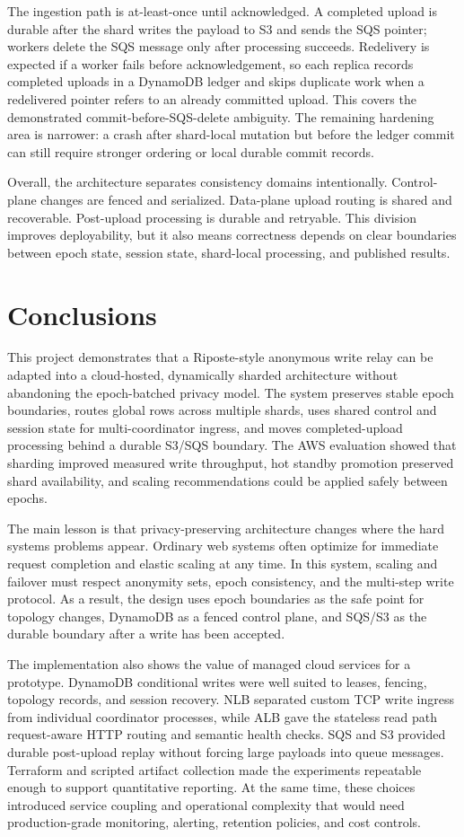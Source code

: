 \documentclass[conference]{IEEEtran}
\begin{document}
The ingestion path is at-least-once until acknowledged. A completed upload is durable after the shard writes the payload to S3 and sends the SQS pointer; workers delete the SQS message only after processing succeeds. Redelivery is expected if a worker fails before acknowledgement, so each replica records completed uploads in a DynamoDB ledger and skips duplicate work when a redelivered pointer refers to an already committed upload. This covers the demonstrated commit-before-SQS-delete ambiguity. The remaining hardening area is narrower: a crash after shard-local mutation but before the ledger commit can still require stronger ordering or local durable commit records.

Overall, the architecture separates consistency domains intentionally. Control-plane changes are fenced and serialized. Data-plane upload routing is shared and recoverable. Post-upload processing is durable and retryable. This division improves deployability, but it also means correctness depends on clear boundaries between epoch state, session state, shard-local processing, and published results.

\section{Conclusions}

This project demonstrates that a Riposte-style anonymous write relay can be adapted into a cloud-hosted, dynamically sharded architecture without abandoning the epoch-batched privacy model. The system preserves stable epoch boundaries, routes global rows across multiple shards, uses shared control and session state for multi-coordinator ingress, and moves completed-upload processing behind a durable S3/SQS boundary. The AWS evaluation showed that sharding improved measured write throughput, hot standby promotion preserved shard availability, and scaling recommendations could be applied safely between epochs.

The main lesson is that privacy-preserving architecture changes where the hard systems problems appear. Ordinary web systems often optimize for immediate request completion and elastic scaling at any time. In this system, scaling and failover must respect anonymity sets, epoch consistency, and the multi-step write protocol. As a result, the design uses epoch boundaries as the safe point for topology changes, DynamoDB as a fenced control plane, and SQS/S3 as the durable boundary after a write has been accepted.

The implementation also shows the value of managed cloud services for a prototype. DynamoDB conditional writes were well suited to leases, fencing, topology records, and session recovery. NLB separated custom TCP write ingress from individual coordinator processes, while ALB gave the stateless read path request-aware HTTP routing and semantic health checks. SQS and S3 provided durable post-upload replay without forcing large payloads into queue messages. Terraform and scripted artifact collection made the experiments repeatable enough to support quantitative reporting. At the same time, these choices introduced service coupling and operational complexity that would need production-grade monitoring, alerting, retention policies, and cost controls.
\end{document}

